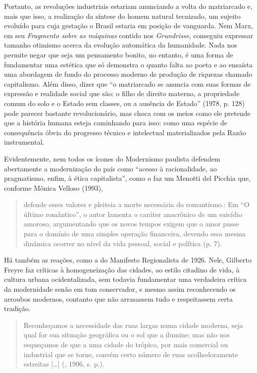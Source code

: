 Portanto, as revoluções industriais estariam anunciando a volta do
matriarcado e, mais que isso, a realização da síntese do homem natural
tecnizado, um sujeito evoluído para cuja gestação o Brasil estaria em
posição de vanguarda. Nem Marx, em seu \emph{Fragmento sobre as
máquinas} contido nos \emph{Grundrisse}, conseguiu expressar tamanho
otimismo acerca da evolução automática da humanidade. Nada nos permite
negar que seja um pensamento bonito, no entanto, é uma forma de
fundamentar uma estética que só demonstra o quanto falta ao poeta e ao
ensaísta uma abordagem de fundo do processo moderno de produção de
riquezas chamado capitalismo. Além disso, dizer que ``o matriarcado se
anuncia com suas formas de expressão e realidade social que são: o filho
de direito materno, a propriedade comum do solo e o Estado sem classes,
ou a ausência de Estado'' (1978, p. 128) pode parecer bastante
revolucionário, mas choca com os meios como ele pretende que a história
humana esteja caminhando para isso: como uma espécie de consequência
óbvia do progresso técnico e intelectual materializados pela Razão
instrumental.

Evidentemente, nem todos os ícones do Modernismo paulista defendem
abertamente a modernização do país como ``acesso à racionalidade, ao
pragmatismo, enfim, à ética capitalista'', como o faz um Menotti del
Picchia que, conforme Mônica Velloso (1993),

\begin{quote}
defende esses valores e pleiteia a morte necessária do romantismo.: Em
``O último romântico'', o autor lamenta o caráter anacrônico de um
suicídio amoroso, argumentando que os novos tempos exigem que o amor
passe para o domínio de uma simples operação financeira, devendo essa
mesma dinâmica ocorrer no nível da vida pessoal, social e política (p. 7).
\end{quote}

Há também as reações, como a do Manifesto Regionalista de 1926. Nele,
Gilberto Freyre faz críticas à homogeneização das cidades, ao estilo
citadino de vida, à cultura urbana ocidentalizada, sem todavia
fundamentar uma verdadeira crítica da modernidade senão em tom
conservador, e mesmo assim reconhecendo os arroubos modernos, contanto
que não arrasassem tudo e respeitassem certa tradição.

\begin{quote}
Reconheçamos a necessidade das ruas largas numa cidade moderna, seja
qual for sua situação geográfica ou o sol que a ilumine; mas não nos
esqueçamos de que a uma cidade do trópico, por mais comercial ou
industrial que se torne, convém certo número de ruas acolhedoramente
estreitas [\ldots{}] (, 1996, s. p.).
\end{quote}

